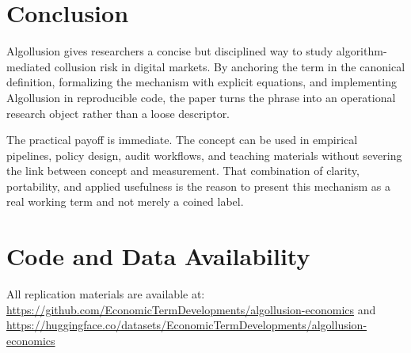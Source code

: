 \documentclass[12pt]{article}
\begin{document}
\section{Conclusion}
Algollusion gives researchers a concise but disciplined way to study algorithm-mediated collusion risk in digital markets. By anchoring the term in the canonical definition, formalizing the mechanism with explicit equations, and implementing Algollusion in reproducible code, the paper turns the phrase into an operational research object rather than a loose descriptor.

The practical payoff is immediate. The concept can be used in empirical pipelines, policy design, audit workflows, and teaching materials without severing the link between concept and measurement. That combination of clarity, portability, and applied usefulness is the reason to present this mechanism as a real working term and not merely a coined label.

\section*{Code and Data Availability}
All replication materials are available at:
\url{https://github.com/EconomicTermDevelopments/algollusion-economics} and
\url{https://huggingface.co/datasets/EconomicTermDevelopments/algollusion-economics}
\end{document}
